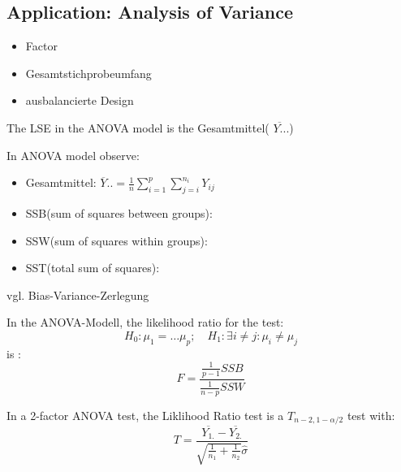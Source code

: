\subsection{Application: Analysis of Variance}
\begin{definition}
\begin{itemize}
    \item Factor
    \item Gesamtstichprobeumfang
    \item ausbalancierte Design
\end{itemize}
\end{definition}

\begin{lemma}
The LSE in the ANOVA model is the Gesamtmittel( $\overline{Y..}$.)
\end{lemma}

\begin{lemma}
In ANOVA model observe:
\begin{itemize}
    \item Gesamtmittel: $\overline{Y}.. = \frac{1}{n} \sum_{i = 1} ^ {p} \sum_{j = i}^{n_{i}} Y_{ij} $
     \item SSB(sum of squares between groups): 
    \item SSW(sum of squares within groups):
    \item SST(total sum of squares): 
\end{itemize}
\end{lemma}

\begin{remark}
vgl. Bias-Variance-Zerlegung
\end{remark}

\begin{theorem}
In the ANOVA-Modell, the likelihood ratio for the test:
\begin{equation*}
    H_0: \mu_1 = \dots \mu_p; \quad H_1: \exists i \neq j: \mu_i \neq \mu_j
\end{equation*}
is :
\begin{equation}
    F = \frac{\frac{1}{p -1}SSB}{\frac{1}{n - p}SSW}
\end{equation}
\end{theorem}

\begin{corollary}
In a 2-factor ANOVA test, the Liklihood Ratio test is a $T_{n - 2, 1-\alpha/2}$ test with:
\begin{equation}
    T = \frac{\overline{Y_{1.}} - \overline{Y_{2.}}}{\sqrt{\frac{1}{  n_1} + \frac{1}{n_2}}\hat{\sigma}}
\end{equation}
\end{corollary}



